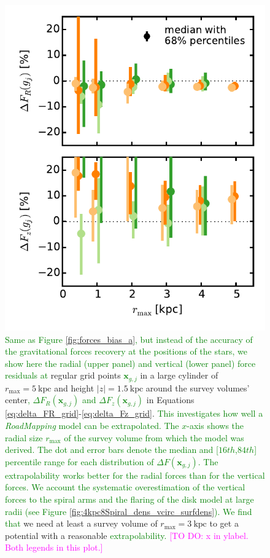 \documentclass[iop,revtex4,numberedappendix,appendixfloats]{emulateapj}
\newcommand{\vect}[1]{\boldsymbol{#1}}
\newcommand{\RM}{{\sl RoadMapping}}
\newcommand{\Wilma}[1]{\textcolor{Magenta}{#1}}
\newcommand{\NEW}[1]{\textcolor{Green}{#1}}
\newcommand{\OLD}[1]{}
\begin{document}
\begin{figure}[!htbp]
\centering
  \includegraphics[width=\columnwidth]{fig/MNdHHdiffSph2_bias_in_forces_recovery_3_b.pdf}
  \caption{\NEW{Same as Figure \ref{fig:forces_bias_a}, but instead of the accuracy of the gravitational forces recovery at the positions of the stars, we show here the radial (upper panel) and vertical (lower panel) force residuals at} regular grid points \NEW{$\vect{x}_{g,j}$} in a large cylinder of $r_\text{max}=5~\text{kpc}$ and height $|z|=1.5~\text{kpc}$ around the survey volumes' center\NEW{, $\Delta F_{R}(\vect{x}_{g,j})$ and $\Delta F_{z}(\vect{x}_{g,j})$} \OLD{($\Delta F_{R}(g_j)$ and $\Delta F_{z}(g_j)$} in Equations \eqref{eq:delta_FR_grid}-\eqref{eq:delta_Fz_grid}\OLD{)}. \NEW{This investigates how well a \RM{} model can be extrapolated. The $x$-axis shows the radial size $r_\text{max}$ of the survey volume from which the model was derived. The dot and error bars denote the median and [$16th$,$84th$] percentile range for each distribution of $\Delta F(\vect{x}_{g,j})$. The extrapolability works better for the radial forces than for the vertical forces. We account the systematic overestimation of the vertical forces to the spiral arms and the flaring of the disk model at large radii (see Figure \ref{fig:4kpc8Spiral_dens_vcirc_surfdens}). We find that} we need at least a survey volume of $r_\text{max}=3~\text{kpc}$ to get a potential with a reasonable \OLD{predictive power.}\NEW{extrapolability.} \Wilma{[TO DO: x in ylabel. Both legends in this plot.]}}
\label{fig:forces_bias_b}
\end{figure}
\end{document}
